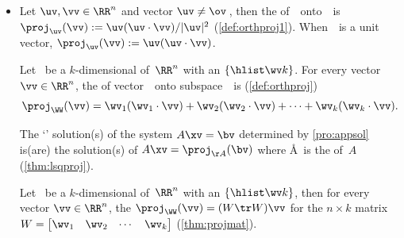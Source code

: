 \begin{itemize}
\begin{itemize}
\item {}\verb|colormap(gray)| draws the current figure with 64~shades of grey (\verb|colormap('list')| lists the available colormaps).

\item {}\verb|imagesc(A)| where \verb|A|~is a \(m\times n\) matrix of values draws an \(m\times n\) image using the values of~\(A\) to determine the colour.

\item {}\verb|log(x)| where \verb|x|~is a  matrix, vector, or scalar computes the natural  to the base~\(e\) of each element, and returns the result(s) as a correspondingly sized matrix, vector, or scalar.

\item {}\verb|exp(x)| where \verb|x|~is a  matrix, vector, or scalar computes the  of each element, and returns the result(s) as a correspondingly sized matrix, vector, or scalar.
\end{itemize}


\item Let \(\uv,\vv\in\RR^n\) and vector \(\uv\neq\ov\)\,, then the  of~\vv\ onto~\uv\ is
\(\proj_\uv(\vv):=\uv({\uv\cdot\vv})/{|\uv|^2}\) (\cref{def:orthproj1}).
When~\uv\ is a unit vector, \(\proj_\uv(\vv):=\uv(\uv\cdot\vv)\).

\itemhi Let \WW\ be a \(k\)-dimensional  of~\(\RR^n\) with an  \(\{\hlist\wv k\}\).
For every vector \(\vv\in\RR^n\), the  of vector~\vv\ onto subspace~\WW\ is (\cref{def:orthproj})
\begin{equation*}
\proj_\WW(\vv)=\wv_1(\wv_1\cdot\vv)+\wv_2(\wv_2\cdot\vv)+\cdots+\wv_k(\wv_k\cdot\vv).
\end{equation*}

\itemme The `' solution(s) of the system \(A\xv=\bv\) determined by \cref{pro:appsol} is(are) the solution(s) of \(A\xv=\proj_{\AA}(\bv)\) where \AA~is the  of~\(A\) (\cref{thm:lsqproj}).

\itemme Let \WW\ be a \(k\)-dimensional  of~\(\RR^n\) with an  \(\{\hlist\wv k\}\), then for every vector \(\vv\in\RR^n\), the 
\(\proj_\WW(\vv)=(W\tr W)\vv\)
for the \(n\times k\) matrix \(W=\begin{bmatrix} \wv_1&\wv_2&\cdots&\wv_k \end{bmatrix}\) (\cref{thm:projmat}).


\end{itemize}
